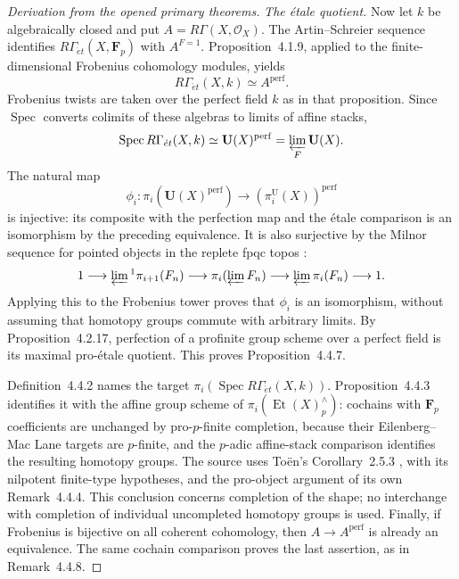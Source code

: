 \begin{proof}[Derivation from the opened primary theorems]
\emph{The \'etale quotient.}
Now let $k$ be algebraically closed and put
$A=R\Gamma(X,\mathcal O_X)$. The Artin--Schreier sequence identifies
$R\Gamma_{\acute et}(X,\mathbf F_p)$ with $A^{F=1}$.
Proposition~4.1.9, applied to the finite-dimensional Frobenius
cohomology modules, yields
\[
 R\Gamma_{\acute et}(X,k)\simeq A^{\mathrm{perf}}.
\]
Frobenius twists are taken over the perfect field $k$ as in that
proposition. Since $\operatorname{Spec}$ converts colimits of these
algebras to limits of affine stacks,
\[
 \operatorname{Spec}R\Gamma_{\acute et}(X,k)
  \simeq\mathbf U(X)^{\mathrm{perf}}
  =\varprojlim_F\mathbf U(X).
\]
The natural map
\[
 \phi_i:\pi_i(\mathbf U(X)^{\mathrm{perf}})
       \longrightarrow(\pi_i^{\mathrm U}(X))^{\mathrm{perf}}
\]
is injective: its composite with the perfection map and the
\'etale comparison is an isomorphism by the preceding equivalence.
It is also surjective by the Milnor sequence for pointed objects
in the replete fpqc topos
\cite[Proposition~3.22, author pp.~10--11]{BMondalReineckePostnikov2025}:
\[
 1\longrightarrow\varprojlim{}^1\pi_{i+1}(F_n)
 \longrightarrow\pi_i(\varprojlim F_n)
 \longrightarrow\varprojlim\pi_i(F_n)\longrightarrow1.
\]
Applying this to the Frobenius tower proves that $\phi_i$ is an
isomorphism, without assuming that homotopy groups commute with
arbitrary limits. By Proposition~4.2.17, perfection of a profinite
group scheme over a perfect field is its maximal pro-\'etale quotient.
This proves Proposition~4.4.7.

Definition~4.4.2 names the target
$\pi_i(\operatorname{Spec}R\Gamma_{\acute et}(X,k))$.
Proposition~4.4.3 identifies it with the affine group scheme of
$\pi_i(\operatorname{Et}(X)^\wedge_p)$: cochains with
$\mathbf F_p$ coefficients are unchanged by pro-$p$-finite completion,
because their Eilenberg--Mac Lane targets are $p$-finite, and the
$p$-adic affine-stack comparison identifies the resulting homotopy
groups. The source uses To\"en's Corollary~2.5.3
\cite[p.~64]{BToen2006}, with its nilpotent finite-type hypotheses,
and the pro-object argument of its own Remark~4.4.4.
This conclusion concerns completion of the shape; no interchange
with completion of individual uncompleted homotopy groups is used.
Finally, if Frobenius is bijective on all coherent cohomology, then
$A\to A^{\mathrm{perf}}$ is already an equivalence. The same cochain
comparison proves the last assertion, as in Remark~4.4.8.
\end{proof}



